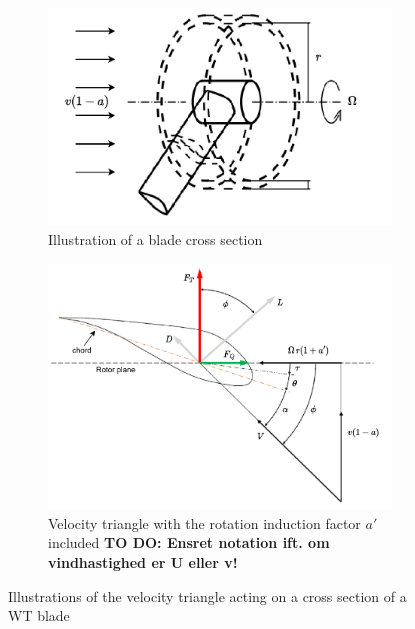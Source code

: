 \begin{figure}[h]
	\centering
	\begin{subfigure}[t]{.44\textwidth}
		\centering
		\includegraphics[width=1\linewidth]{Graphics/RotorBladeElement.pdf}
		\caption{Illustration of a blade cross section}
		\label{fig:blade_vel_triangles}
	\end{subfigure}%
	\hspace{0.01cm}
	\begin{subfigure}[t]{.55\textwidth}
		\centering
		\includegraphics[width=1\linewidth]{Graphics/BladeVelocityTriangle.pdf}
		\caption{Velocity triangle with the rotation induction factor $ a' $ included \textbf{TO DO: Ensret notation ift. om vindhastighed er U eller v!}}
		\label{fig:blade_vel_triangle}
	\end{subfigure}
	
	\caption{Illustrations of the velocity triangle acting on a cross section of a WT blade}
	\label{fig:blade_triangles}
\end{figure}

